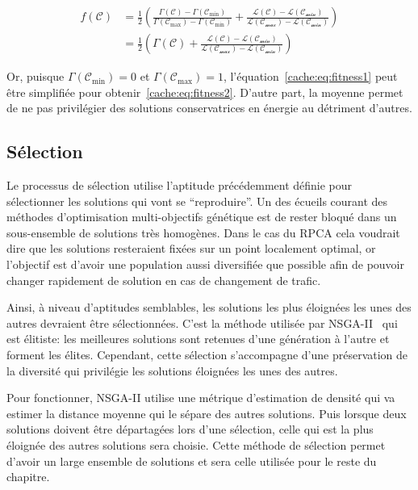 \begin{align}
  f(\mathcal{C}) &= \frac{1}{2} \left(
    \frac{\Gamma(\mathcal{C}) - \Gamma(\mathcal{C}_{\textrm{min}})}
    {\Gamma(\mathcal{C}_{\textrm{max}}) - \Gamma(\mathcal{C}_{\textrm{min}})}
    +
    \frac{\mathcal{L(C)} - \mathcal{L(C_{\textrm{min}})}}
    {\mathcal{L(C_{\textrm{max}})} - \mathcal{L(C_{\textrm{min}})}}\right)
    \label{cache:eq:fitness1}\\
                 &= \frac{1}{2} \left(\Gamma(\mathcal{C})
      +\frac{\mathcal{L(C)} - \mathcal{L(C_{\textrm{min}})}}
      {\mathcal{L(C_{\textrm{max}})} - \mathcal{L(C_{\textrm{min}})}}\right)
  \label{cache:eq:fitness2}
\end{align}

Or, puisque $\Gamma(\mathcal{C}_{\textrm{min}}) = 0$ et $\Gamma(\mathcal{C}_{\textrm{max}}) = 1$,  l'équation~\eqref{cache:eq:fitness1} peut être simplifiée pour obtenir~\eqref{cache:eq:fitness2}.
D'autre part, la moyenne permet de ne pas privilégier des solutions conservatrices en énergie au détriment d'autres.

\subsection{Sélection}
\label{cache:selection}

Le processus de sélection utilise l'aptitude précédemment définie pour sélectionner les solutions qui vont se ``reproduire''.
Un des écueils courant des méthodes d'optimisation multi-objectifs génétique est de rester bloqué dans un sous-ensemble de solutions très homogènes.
Dans le cas du \ac{RPCA} cela voudrait dire que les solutions resteraient fixées sur un point localement optimal, or l'objectif est d'avoir une population aussi diversifiée que possible afin de pouvoir changer rapidement de solution en cas de changement de trafic.

Ainsi, à niveau d'aptitudes semblables, les solutions les plus éloignées les unes des autres devraient être sélectionnées.
C'est la méthode utilisée par NSGA-II~\cite{deb1999niched} qui est élitiste: les meilleures solutions sont retenues d'une génération à l'autre et forment les élites.
Cependant, cette sélection s'accompagne d'une préservation de la diversité qui privilégie les solutions éloignées les unes des autres.

Pour fonctionner, NSGA-II utilise une métrique d'estimation de densité qui va estimer la distance moyenne qui le sépare des autres solutions.
Puis lorsque deux solutions doivent être départagées lors d'une sélection, celle qui est la plus éloignée des autres solutions sera choisie.
Cette méthode de sélection permet d'avoir un large ensemble de solutions et sera celle utilisée pour le reste du chapitre.


